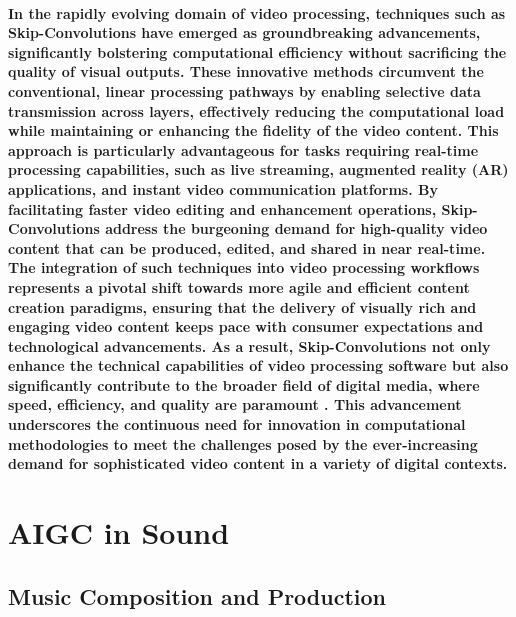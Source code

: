 \documentclass[11pt,a4paper,oneside]{report}
\begin{document}
\paragraph{In the rapidly evolving domain of video processing, techniques such as Skip-Convolutions have emerged as groundbreaking advancements, significantly bolstering computational efficiency without sacrificing the quality of visual outputs. These innovative methods circumvent the conventional, linear processing pathways by enabling selective data transmission across layers, effectively reducing the computational load while maintaining or enhancing the fidelity of the video content. This approach is particularly advantageous for tasks requiring real-time processing capabilities, such as live streaming, augmented reality (AR) applications, and instant video communication platforms. By facilitating faster video editing and enhancement operations, Skip-Convolutions address the burgeoning demand for high-quality video content that can be produced, edited, and shared in near real-time. The integration of such techniques into video processing workflows represents a pivotal shift towards more agile and efficient content creation paradigms, ensuring that the delivery of visually rich and engaging video content keeps pace with consumer expectations and technological advancements. As a result, Skip-Convolutions not only enhance the technical capabilities of video processing software but also significantly contribute to the broader field of digital media, where speed, efficiency, and quality are paramount \cite{habibian2021skip}. This advancement underscores the continuous need for innovation in computational methodologies to meet the challenges posed by the ever-increasing demand for sophisticated video content in a variety of digital contexts.}

\section{AIGC in Sound}

\subsection{Music Composition and Production}
\end{document}
